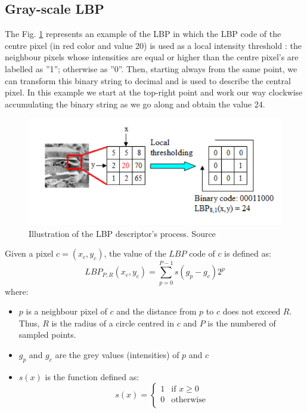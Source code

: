 \subsection{Gray-scale LBP}

The Fig. \ref{fig:lbp_process} represents an example of the LBP in which the LBP code of the centre pixel (in red color and value 20) is used as a local intensity threshold : the neighbour pixels whose intensities are equal or higher than the centre pixel’s are labelled as ”1”; otherwise as ”0”. Then, starting always from the same point, we can transform this binary string to decimal and is used to describe the central pixel. In this example we start at the top-right point and work our way clockwise accumulating the binary string as we go along and obtain the value 24.

\begin{figure}[h]
    \includegraphics[scale=0.55]{img/lbp}
    \caption[Illustration of the LBP descriptor's process]{Illustration of the LBP descriptor's process. Source \cite{Ojala2002}}
    \label{fig:lbp_process}
\end{figure}

Given a pixel $c = (x_c, y_c)$, the value of the $LBP$ code of $c$ is defined as:
$$LBP_{P, R} (x_c, y_c) = \sum_{p = 0}^{P - 1} s (g_p - g_c) 2^p$$
where:
\begin{itemize}
    \item $p$ is a neighbour pixel of $c$ and the distance from $p$ to $c$ does not exceed $R$. Thus, $R$ is the radius of a circle centred in $c$ and $P$ is the numbered of sampled points.
    \item $g_p$ and $g_c$ are the grey values (intensities) of $p$ and $c$
    \item $s(x)$ is the function defined as:
    \begin{equation}
    s(x) =
    \begin{cases}
    1 & \text{if $x \geq 0$}\\
    0 & \text{otherwise} \\
    \end{cases}
    \end{equation}
\end{itemize}

